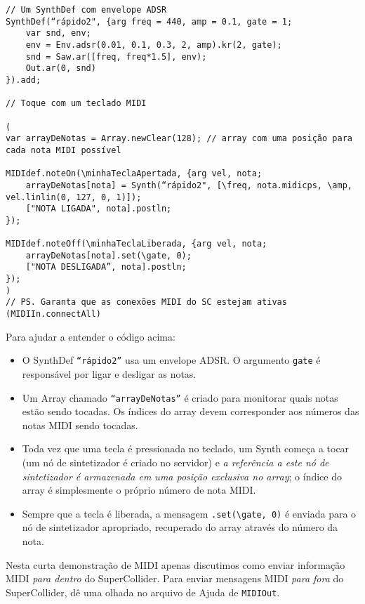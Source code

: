 \begin{lstlisting}[style=SuperCollider-IDE, basicstyle=\scttfamily\footnotesize]
 // Um SynthDef com envelope ADSR
SynthDef(“rápido2", {arg freq = 440, amp = 0.1, gate = 1;
	var snd, env;
	env = Env.adsr(0.01, 0.1, 0.3, 2, amp).kr(2, gate);
	snd = Saw.ar([freq, freq*1.5], env);	
	Out.ar(0, snd)
}).add;

// Toque com um teclado MIDI

(
var arrayDeNotas = Array.newClear(128); // array com uma posição para cada nota MIDI possível

MIDIdef.noteOn(\minhaTeclaApertada, {arg vel, nota;
	arrayDeNotas[nota] = Synth(“rápido2", [\freq, nota.midicps, \amp, vel.linlin(0, 127, 0, 1)]);
	["NOTA LIGADA", nota].postln;
});
	
MIDIdef.noteOff(\minhaTeclaLiberada, {arg vel, nota;
	arrayDeNotas[nota].set(\gate, 0);
	["NOTA DESLIGADA”, nota].postln;
});
)
// PS. Garanta que as conexões MIDI do SC estejam ativas (MIDIIn.connectAll)
 \end{lstlisting} 
 
Para ajudar a entender o código acima:

\begin{itemize}
\item O SynthDef \texttt{“rápido2”} usa um envelope ADSR. O argumento \texttt{gate} é responsável por ligar e desligar as notas.
\item Um Array chamado \texttt{“arrayDeNotas”} é criado para monitorar quais notas estão sendo tocadas. Os índices do array devem corresponder aos números das notas MIDI sendo tocadas.
\item Toda vez que uma tecla é pressionada no teclado, um Synth começa a tocar (um nó de sintetizador é criado no servidor) e \emph{a referência a este nó de sintetizador é armazenada em uma posição exclusiva no array}; o índice do array é simplesmente o próprio número de nota MIDI.
\item Sempre que a tecla é liberada, a mensagem \texttt{.set(\textbackslash gate, 0)} é enviada para o nó de sintetizador apropriado, recuperado do array através do número da nota.
\end{itemize}

Nesta curta demonstração de MIDI apenas discutimos como enviar informação MIDI \emph{para dentro} do SuperCollider. Para enviar mensagens MIDI \emph{para fora} do SuperCollider, dê uma olhada no arquivo de Ajuda de \texttt{MIDIOut}.
